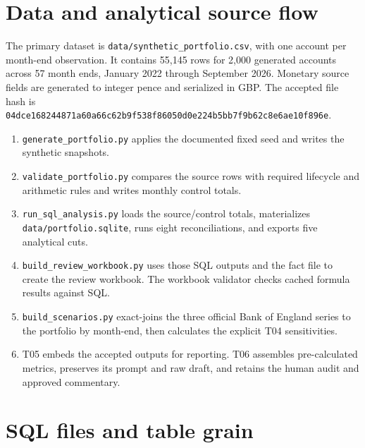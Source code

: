 \documentclass[11pt]{article}
\begin{document}
\section{Data and analytical source flow}

The primary dataset is \texttt{data/synthetic\_portfolio.csv}, with one account per month-end observation. It contains 55,145 rows for 2,000 generated accounts across 57 month ends, January 2022 through September 2026. Monetary source fields are generated to integer pence and serialized in GBP. The accepted file hash is \texttt{04dce168244871a60a66c62b9f538f86050d0e224b5bb7f9b62c8e6ae10f896e}.

\begin{enumerate}
\item \texttt{generate\_portfolio.py} applies the documented fixed seed and writes the synthetic snapshots.
\item \texttt{validate\_portfolio.py} compares the source rows with required lifecycle and arithmetic rules and writes monthly control totals.
\item \texttt{run\_sql\_analysis.py} loads the source/control totals, materializes \texttt{data/portfolio.sqlite}, runs eight reconciliations, and exports five analytical cuts.
\item \texttt{build\_review\_workbook.py} uses those SQL outputs and the fact file to create the review workbook. The workbook validator checks cached formula results against SQL.
\item \texttt{build\_scenarios.py} exact-joins the three official Bank of England series to the portfolio by month-end, then calculates the explicit T04 sensitivities.
\item T05 embeds the accepted outputs for reporting. T06 assembles pre-calculated metrics, preserves its prompt and raw draft, and retains the human audit and approved commentary.
\end{enumerate}

\section{SQL files and table grain}
\end{document}
